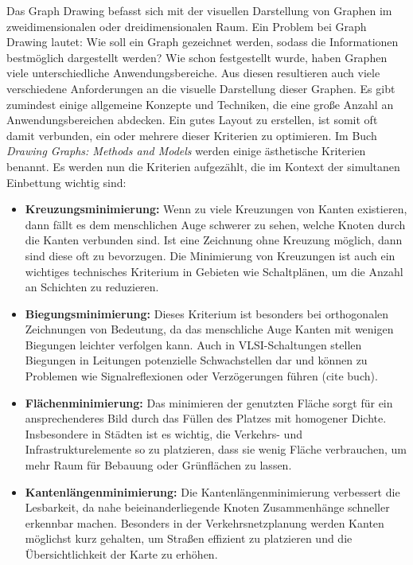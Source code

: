 \documentclass[bachelor, german]{algothesis}
\begin{document}
Das Graph Drawing befasst sich mit der visuellen Darstellung von Graphen im zweidimensionalen oder dreidimensionalen Raum. Ein Problem bei Graph Drawing lautet: Wie soll ein Graph gezeichnet werden, sodass die Informationen bestmöglich dargestellt werden? Wie schon festgestellt wurde, haben Graphen viele unterschiedliche Anwendungsbereiche. Aus diesen resultieren auch viele verschiedene Anforderungen an die visuelle Darstellung dieser Graphen.\newline
Es gibt zumindest einige allgemeine Konzepte und Techniken, die eine große Anzahl an Anwendungsbereichen abdecken. Ein gutes Layout zu erstellen, ist somit oft damit verbunden, ein oder mehrere dieser Kriterien zu optimieren. Im Buch \textit{Drawing Graphs: Methods and Models} \cite{DrawingMeth} werden einige ästhetische Kriterien benannt. Es werden nun die Kriterien aufgezählt, die im Kontext der simultanen Einbettung wichtig sind: 
\begin{itemize}
    \item  \textbf{Kreuzungsminimierung:} Wenn zu viele Kreuzungen von Kanten existieren, dann fällt es dem menschlichen Auge schwerer zu sehen, welche Knoten durch die Kanten verbunden sind. Ist eine Zeichnung ohne Kreuzung möglich, dann sind diese oft zu bevorzugen. Die Minimierung von Kreuzungen ist auch ein wichtiges technisches Kriterium in Gebieten wie Schaltplänen, um die Anzahl an Schichten zu reduzieren.
    \item  \textbf{Biegungsminimierung:} Dieses Kriterium ist besonders bei orthogonalen Zeichnungen von Bedeutung, da das menschliche Auge Kanten mit wenigen Biegungen leichter verfolgen kann. Auch in VLSI-Schaltungen stellen Biegungen in Leitungen potenzielle Schwachstellen dar und können zu Problemen wie Signalreflexionen oder Verzögerungen führen (cite buch).
    \item  \textbf{Flächenminimierung:} Das minimieren der genutzten Fläche sorgt für ein ansprechenderes Bild durch das Füllen des Platzes mit homogener Dichte. Insbesondere in Städten ist es wichtig, die Verkehrs- und Infrastrukturelemente so zu platzieren, dass sie wenig Fläche verbrauchen, um mehr Raum für Bebauung oder Grünflächen zu lassen.
    \item  \textbf{Kantenlängenminimierung:} Die Kantenlängenminimierung verbessert die Lesbarkeit, da nahe beieinanderliegende Knoten Zusammenhänge schneller erkennbar machen. Besonders in der Verkehrsnetzplanung werden Kanten möglichst kurz gehalten, um Straßen effizient zu platzieren und die Übersichtlichkeit der Karte zu erhöhen.
\end{itemize}
\end{document}
